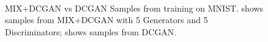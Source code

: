 \documentclass{article}
\begin{document}
\begin{figure}[!htb]%
  \centering
  \hspace{8pt}%
  \\
  \caption{MIX+DCGAN vs DCGAN Samples from training on MNIST. 
    \protect{} shows samples from MIX+DCGAN with 5 Generators and 5 Discriminators; \protect{} shows samples from DCGAN.
  }
  \label{fig:ex4}%
\end{figure}
\end{document}
